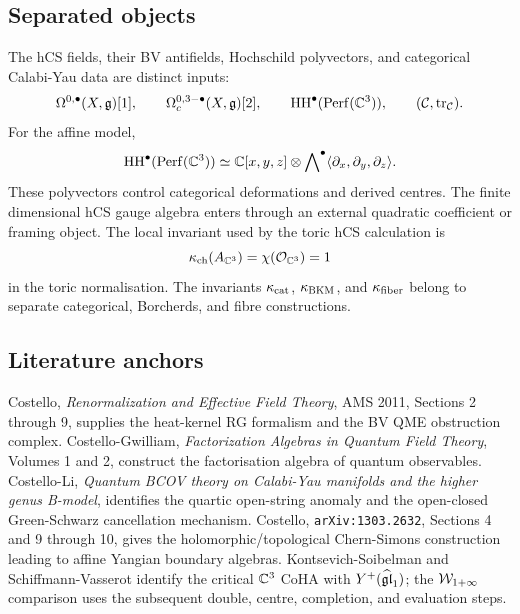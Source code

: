 \subsection{Separated objects}

The hCS fields, their BV antifields, Hochschild polyvectors, and
categorical Calabi-Yau data are distinct inputs:
\[
  \Omega^{0,\bullet}(X,\mathfrak{g})[1],
  \qquad
  \Omega^{0,3-\bullet}_c(X,\mathfrak{g})[2],
  \qquad
  \mathrm{HH}^\bullet(\mathrm{Perf}(\mathbb{C}^3)),
  \qquad
  (\mathcal C,\operatorname{tr}_{\mathcal C}).
\]
For the affine model,
\[
  \mathrm{HH}^\bullet(\mathrm{Perf}(\mathbb{C}^3))
  \simeq
  \mathbb{C}[x,y,z]\otimes
  \bigwedge\nolimits^\bullet
  \langle\partial_x,\partial_y,\partial_z\rangle .
\]
These polyvectors control categorical deformations and derived centres.
The finite dimensional hCS gauge algebra enters through an external
quadratic coefficient or framing object.  The local invariant used by
the toric hCS calculation is
\[
  \kappa_{\mathrm{ch}}(A_{\mathbb{C}^3})=\chi(\mathcal{O}_{\mathbb{C}^3})=1
\]
in the toric normalisation.  The invariants \(\kappa_{\mathrm{cat}}\), \(\kappa_{\mathrm{BKM}}\), and
\(\kappa_{\mathrm{fiber}}\) belong to separate categorical, Borcherds, and fibre
constructions.

\subsection{Literature anchors}

Costello, \emph{Renormalization and Effective Field Theory}, AMS 2011,
Sections 2 through 9, supplies the heat-kernel RG formalism and the BV
QME obstruction complex.  Costello-Gwilliam,
\emph{Factorization Algebras in Quantum Field Theory}, Volumes 1 and 2,
construct the factorisation algebra of quantum observables.  Costello-Li,
\emph{Quantum BCOV theory on Calabi-Yau manifolds and the higher genus
B-model}, identifies the quartic open-string anomaly and the
open-closed Green-Schwarz cancellation mechanism.  Costello,
\texttt{arXiv:1303.2632}, Sections 4 and 9 through 10, gives the
holomorphic/topological Chern-Simons construction leading to affine
Yangian boundary algebras.  Kontsevich-Soibelman and
Schiffmann-Vasserot identify the critical \(\mathbb{C}^3\) CoHA with
\(Y^{+}(\widehat{\mathfrak{gl}}_1)\); the \(\mathcal{W}_{1+\infty}\) comparison uses the subsequent
double, centre, completion, and evaluation steps.
